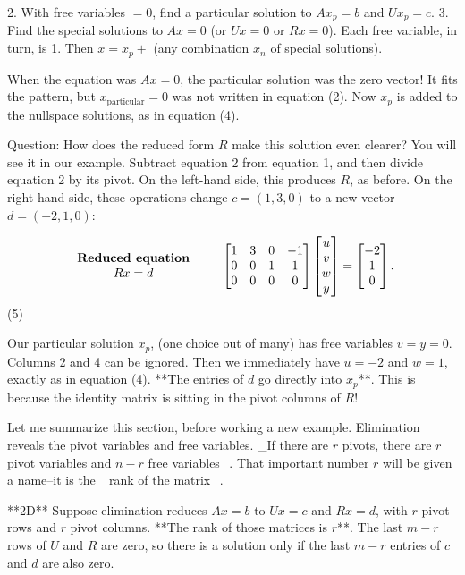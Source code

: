 2. With free variables \(=0\), find a particular solution to \(Ax_{p}=b\) and \(Ux_{p}=c\).
3. Find the special solutions to \(Ax=0\) (or \(Ux=0\) or \(Rx=0\)). Each free variable, in turn, is 1. Then \(x=x_{p}+\) (any combination \(x_{n}\) of special solutions).

When the equation was \(Ax=0\), the particular solution was the zero vector! It fits the pattern, but \(x_{\text{particular}}=0\) was not written in equation (2). Now \(x_{p}\) is added to the nullspace solutions, as in equation (4).

Question: How does the reduced form \(R\) make this solution even clearer? You will see it in our example. Subtract equation 2 from equation 1, and then divide equation 2 by its pivot. On the left-hand side, this produces \(R\), as before. On the right-hand side, these operations change \(c=(1,3,0)\) to a new vector \(d=(-2,1,0)\):

\[\begin{array}{c}\text{\bf Reduced equation}\\ Rx=d\end{array}\qquad\begin{bmatrix}1&3&0&-1\\ 0&0&1&1\\ 0&0&0&0\end{bmatrix}\begin{bmatrix}u\\ v\\ w\\ y\end{bmatrix}=\begin{bmatrix}-2\\ 1\\ 0\end{bmatrix}.\] (5)

Our particular solution \(x_{p}\), (one choice out of many) has free variables \(v=y=0\). Columns 2 and 4 can be ignored. Then we immediately have \(u=-2\) and \(w=1\), exactly as in equation (4). **The entries of \(d\) go directly into \(x_{p}\)**. This is because the identity matrix is sitting in the pivot columns of \(R\)!

Let me summarize this section, before working a new example. Elimination reveals the pivot variables and free variables. _If there are \(r\) pivots, there are \(r\) pivot variables and \(n-r\) free variables_. That important number \(r\) will be given a name--it is the _rank of the matrix_.

**2D** Suppose elimination reduces \(Ax=b\) to \(Ux=c\) and \(Rx=d\), with \(r\) pivot rows and \(r\) pivot columns. **The rank of those matrices is \(r\)**. The last \(m-r\) rows of \(U\) and \(R\) are zero, so there is a solution only if the last \(m-r\) entries of \(c\) and \(d\) are also zero.

